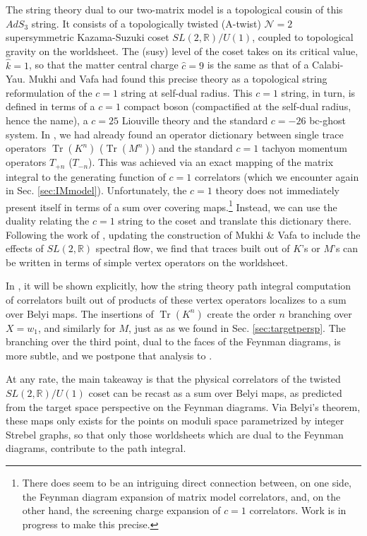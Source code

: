 \documentclass[english]{article}
\DeclareMathOperator{\Tr}{Tr}
\renewcommand{\>}{\rangle}
\newcommand{\<}{\langle}
\renewcommand{\(}{\left(}
\renewcommand{\)}{\right)}
\begin{document}
The string theory dual to our two-matrix model is a topological cousin of this $AdS_{3}$ string. It consists of a topologically twisted (A-twist) $\mathcal{N}=2$ supersymmetric Kazama-Suzuki coset $SL(2,\mathbb{R})/U(1)$, coupled to topological gravity on the worldsheet. The (susy) level of the coset takes on its critical value, $\hat{k}=1$, so that the matter central charge $\hat{c}=9$ is the same as that of a Calabi-Yau. Mukhi and Vafa \cite{MukhiVafa} had found this precise theory as a topological string reformulation of the $c=1$ string at self-dual radius. This $c=1$ string, in turn, is defined in terms of a $c=1$ compact boson (compactified at the self-dual radius, hence the name), a $c=25$ Liouville theory and the standard $c=-26$ bc-ghost system. In \cite{DSDI}, we had already found an operator dictionary between single trace operators $\Tr(K^n)$ ($\Tr(M^n)$) and the standard $c=1$ tachyon momentum operators $T_{+n}$ ($T_{-n}$). This was achieved via an exact mapping of the matrix integral to the generating function of $c=1$ correlators (which we encounter again in Sec. \ref{sec:IMmodel}). Unfortunately, the $c=1$ theory does not immediately present itself in terms of a sum over covering maps.\footnote{There does seem to be an intriguing direct connection between, on one side, the Feynman diagram expansion of matrix model correlators, and, on the other hand, the screening charge expansion of $c=1$ correlators. Work is in progress to make this precise.} Instead, we can use the duality relating the $c=1$ string to the coset and translate this dictionary there. Following the work of \cite{ashok2006topological}, updating the construction of Mukhi \& Vafa to include the effects of $SL(2,\mathbb{R})$ spectral flow, we find that traces built out of $K$'s or $M$'s can be written in terms of simple vertex operators on the worldsheet.
 
In \cite{DSDIII}, it will be shown explicitly, how the string theory path integral computation of correlators built out of products of these vertex operators localizes to a sum over Belyi maps. The insertions of $\Tr(K^{n})$ create the order $n$ branching over $X=w_1$, and similarly for $M$, just as as we found in Sec. \ref{sec:targetpersp}. The branching over the third point, dual to the faces of the Feynman diagrams, is more subtle, and we postpone that analysis to \cite{DSDIII}. 

At any rate, the main takeaway is that the physical correlators of the twisted $SL(2,\mathbb{R})/U(1)$ coset can be recast as a sum over Belyi maps, as predicted from the target space perspective on the Feynman diagrams. Via Belyi's theorem, these maps only exists for the points on moduli space parametrized by integer Strebel graphs, so that only those worldsheets which are dual to the Feynman diagrams, contribute to the path integral.  
\end{document}
